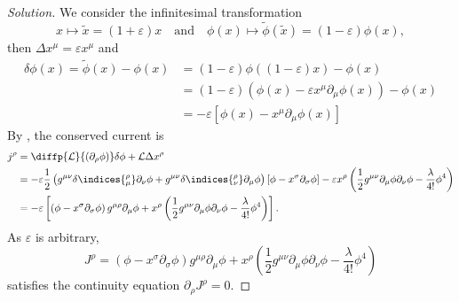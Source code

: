 \begin{proof}[Solution]
   We consider the infinitesimal transformation
   \begin{equation*}
      x \mapsto \tilde{x} = (1 + \varepsilon)x
      \quad\text{and}\quad
      \phi(x) \mapsto \tilde{\phi}(\tilde{x}) = (1 - \varepsilon) \phi(x),
   \end{equation*}
   then \(\Delta x^\mu = \varepsilon x^\mu\) and
   \begin{align*}
      \delta\phi(x) = \tilde{\phi}(x) - \phi(x) 
      &= (1 - \varepsilon) \phi( (1 - \varepsilon)x) - \phi(x)\\
      &= (1 - \varepsilon) \left(\phi(x) - \varepsilon x^\mu \partial_\mu \phi(x)\right) - \phi(x)\\
      &= -\varepsilon \left[\phi(x) - x^\mu \partial_\mu \phi(x)\right]
   \end{align*}
   By , the conserved current is
   \begin{align*}
      j^\rho &= \diffp{\mathcal{L}}{(\partial_\rho \phi)} \delta\phi + \mathcal{L} \Delta x^\rho\\
             &= -\varepsilon \frac12 \left(g^{\mu \nu}\delta\indices{^\rho_\mu} \partial_\nu \phi + g^{\mu\nu} \delta\indices{^\rho_\nu} \partial_\mu \phi\right)\left[\phi - x^\sigma \partial_\sigma \phi\right] - \varepsilon x^\rho \left(\frac12 g^{\mu\nu} \partial_\mu\phi \partial_\nu \phi - \frac\lambda{4!} \phi^4\right)\\
             &= - \varepsilon \left[\left(\phi - x^\sigma \partial_\sigma \phi\right)g^{\mu \rho} \partial_\mu \phi  + x^\rho \left(\frac12 g^{\mu\nu} \partial_\mu \phi \partial_\nu \phi - \frac\lambda{4!}\phi^4\right)\right].
   \end{align*}
   As \(\varepsilon\) is arbitrary,
   \begin{equation*}
       J^\rho = \left(\phi - x^\sigma \partial_\sigma \phi\right)g^{\mu \rho} \partial_\mu \phi  + x^\rho \left(\frac12 g^{\mu\nu} \partial_\mu \phi \partial_\nu \phi - \frac\lambda{4!}\phi^4\right)
   \end{equation*}
   satisfies the continuity equation \(\partial_\rho J^\rho = 0\).
\end{proof}
